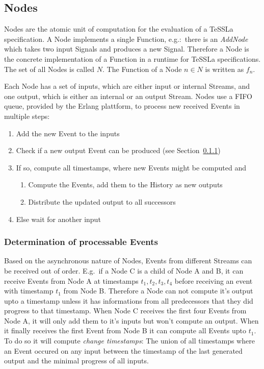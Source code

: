 \subsection{Nodes}
\label{sec:concepts:defs:nodes}

Nodes are the atomic unit of computation for the evaluation of a TeSSLa specification.
A Node implements a single Function, e.g.:\ there is an \emph{AddNode} which takes two input Signals and produces a new Signal.
Therefore a Node is the concrete implementation of a Function in a runtime for TeSSLa specifications.
The set of all Nodes is called \(N\).
The Function of a Node \(n \in N\) is written as \(f_n\).

Each Node has a set of inputs, which are either input or internal Streams, and one output, which is either an internal or an output Stream.
Nodes use a FIFO queue, provided by the Erlang plattform, to process new received Events in multiple steps:

\begin{enumerate}
  \item Add the new Event to the inputs
  \item Check if a new output Event can be produced (see Section~\ref{sec:concepts:defs:nodes:processable})
  \item If so, compute all timestamps, where new Events might be computed and
    \begin{enumerate}
      \item Compute the Events, add them to the History as new outputs
      \item Distribute the updated output to all successors
    \end{enumerate}
  \item Else wait for another input
\end{enumerate}

\subsubsection{Determination of processable Events}
\label{sec:concepts:defs:nodes:processable}

Based on the asynchronous nature of Nodes, Events from different Streams can be received out of order.
E.g.\ if a Node C is a child of Node A and B, it can receive Events from Node A at timestamps \(t_1, t_2, t_3, t_4\)
before receiving an event with timestamp \(t_1\) from Node B.
Therefore a Node can not compute it's output upto a timestamp unless it has informations from all predecessors that they did progress to that timestamp.
When Node C receives the first four Events from Node A, it will only add them to it's inputs but won't compute an output.
When it finally receives the first Event from Node B it can compute all Events upto \(t_1\).
To do so it will compute \emph{change timestamps}: The union of all timestamps where an Event occured on any input between the timestamp of the last generated output and the minimal progress of all inputs.


